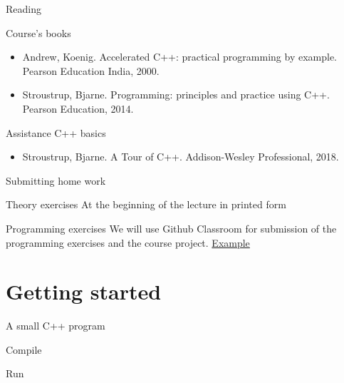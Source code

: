 \documentclass[12pt]{beamer}
\begin{document}
\begin{frame}{Reading}

\begin{block}{Course's books}
\begin{itemize}
\item Andrew, Koenig. Accelerated C++: practical programming by example. Pearson Education India, 2000.
\item Stroustrup, Bjarne. Programming: principles and practice using C++. Pearson Education, 2014.
\end{itemize}
\end{block}

\begin{block}{Assistance C++ basics }
\begin{itemize}
\item Stroustrup, Bjarne. A Tour of C++. Addison-Wesley Professional, 2018.
\end{itemize}
\end{block}
\end{frame}

\begin{frame}{Submitting home work}

\begin{block}{Theory exercises}
At the beginning of the lecture in printed form
\end{block}

\begin{block}{Programming exercises}
We will use Github Classroom for submission of the programming exercises and the course project. \href{https://www.diehlpk.de/blog/githubclassroom/}{Example}

\end{block}
\end{frame}



\section{Getting started}

\begin{frame}{A small C++ program}



\begin{block}{Compile}

\end{block}


\begin{block}{Run}

\end{block}


\end{frame}
\end{document}
